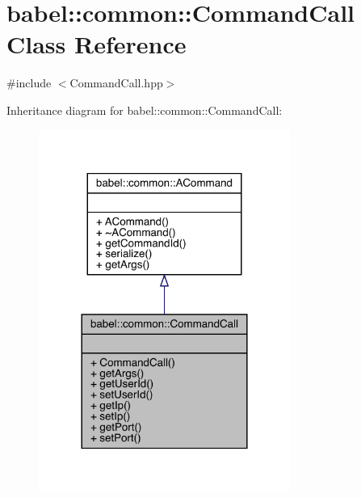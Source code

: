\hypertarget{classbabel_1_1common_1_1_command_call}{}\section{babel\+:\+:common\+:\+:Command\+Call Class Reference}
\label{classbabel_1_1common_1_1_command_call}


{\ttfamily \#include $<$Command\+Call.\+hpp$>$}



Inheritance diagram for babel\+:\+:common\+:\+:Command\+Call\+:\nopagebreak
\begin{figure}[H]
\begin{center}
\leavevmode
\includegraphics[width=233pt]{classbabel_1_1common_1_1_command_call__inherit__graph}
\end{center}
\end{figure}


